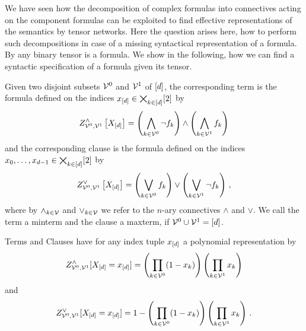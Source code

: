 We have seen how the decomposition of complex formulas into connectives acting on the component formulas can be exploited to find effective representations of the semantics by tensor networks.
Here the question arises here, how to perform such decompositions in case of a missing syntactical representation of a formula.
By  any binary tensor is a formula.
We show in the following, how we can find a syntactic specification of a formula given its tensor.

%


\begin{definition}\label{def:clauses}
	Given two disjoint subsets $\mathcal{V}^{0}$ and $\mathcal{V}^{1}$ of $[d]$, the corresponding term is the formula defined on the indices $x_{[d]}\in\bigtimes_{k\in[d]}[2]$ by
		\[ Z^{\land}_{\mathcal{V}^{0},\mathcal{V}^{1}}\left[X_{[d]}\right]
		=\left( \bigwedge_{k\in\mathcal{V}^{0}} \lnot f_{k} \right)  \land \left( \bigwedge_{k\in\mathcal{V}^{1}} f_{k} \right)  \]
	and the corresponding clause is the formula defined on the indices $x_{0},\ldots,x_{d-1}\in\bigtimes_{k\in[d]}[2]$ by
		\[ Z^{\lor}_{\mathcal{V}^{0},\mathcal{V}^{1}}\left[X_{[d]}\right]
		=\left( \bigvee_{k\in\mathcal{V}^{0}} f_{k} \right)  \lor \left( \bigvee_{k\in\mathcal{V}^{1}} \lnot f_{k} \right)  \, , \]
	where by $\land_{k\in\mathcal{V}}$ and $\lor_{k\in\mathcal{V}}$ we refer to the $n$-ary connectives $\land$ and $\lor$.
	We call the term a minterm and the clause a maxterm, if $\mathcal{V}^{0}\cup\mathcal{V}^{1} = [d]$.
\end{definition}

Terms and Clauses have for any index tuple $x_{[d]}$ a polynomial representation by
		\[ Z^{\land}_{\mathcal{V}^{0},\mathcal{V}^{1}}[X_{[d]}=x_{[d]}] 
		= \left( \prod_{k \in \mathcal{V}^{0}} (1-x_{k}) \right)
		\left(  \prod_{k \in \mathcal{V}^{1}} x_{k} \right) \]
and
		\[ Z^{\lor}_{\mathcal{V}^{0},\mathcal{V}^{1}}[X_{[d]}=x_{[d]}] 
		= 1 - \left( \prod_{k \in \mathcal{V}^{0}} (1-x_{k})\right)
		\left(  \prod_{k \in \mathcal{V}^{1}} x_{k} \right) \, . \]


